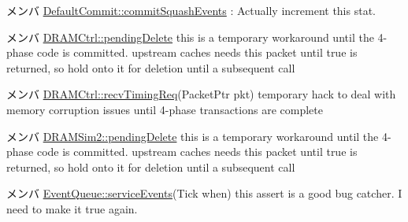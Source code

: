 \label{todo__todo000026}
\hypertarget{todo__todo000026}{}
 
\begin{DoxyDescription}
\item[メンバ \hyperlink{classDefaultCommit_a89ef54d73dbded95395181561013b0b6}{DefaultCommit::commitSquashEvents} ]: Actually increment this stat. 
\end{DoxyDescription}

\label{todo__todo000083}
\hypertarget{todo__todo000083}{}
 
\begin{DoxyDescription}
\item[メンバ \hyperlink{classDRAMCtrl_a21da4bea3554874b557428e4cce5d4a4}{DRAMCtrl::pendingDelete} ]this is a temporary workaround until the 4-\/phase code is committed. upstream caches needs this packet until true is returned, so hold onto it for deletion until a subsequent call 
\end{DoxyDescription}

\label{todo__todo000082}
\hypertarget{todo__todo000082}{}
 
\begin{DoxyDescription}
\item[メンバ \hyperlink{classDRAMCtrl_a3344d9dd0f83257feab5424e761f31c6}{DRAMCtrl::recvTimingReq}(PacketPtr pkt) ]temporary hack to deal with memory corruption issues until 4-\/phase transactions are complete 
\end{DoxyDescription}

\label{todo__todo000084}
\hypertarget{todo__todo000084}{}
 
\begin{DoxyDescription}
\item[メンバ \hyperlink{classDRAMSim2_a21da4bea3554874b557428e4cce5d4a4}{DRAMSim2::pendingDelete} ]this is a temporary workaround until the 4-\/phase code is committed. upstream caches needs this packet until true is returned, so hold onto it for deletion until a subsequent call 
\end{DoxyDescription}

\label{todo__todo000091}
\hypertarget{todo__todo000091}{}
 
\begin{DoxyDescription}
\item[メンバ \hyperlink{classEventQueue_adc925eabe90846085072915cc6c544c2}{EventQueue::serviceEvents}(Tick when) ]this assert is a good bug catcher. I need to make it true again. 
\end{DoxyDescription}

